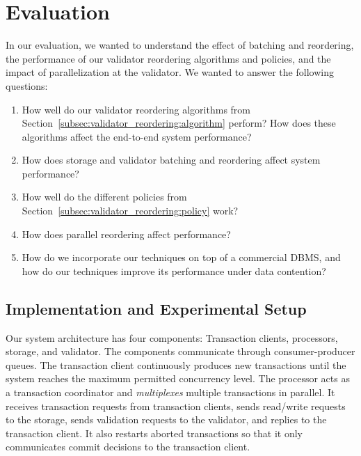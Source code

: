 \section{Evaluation}\label{sec:experiments}

In our evaluation, we wanted to understand the effect of batching and reordering, the performance of our validator reordering algorithms and policies, and the impact of parallelization at the validator.
We wanted to answer the following questions:
\begin{enumerate}[leftmargin=*]
\item How well do our validator reordering algorithms from Section~\ref{subsec:validator_reordering:algorithm} perform? How does these algorithms affect the end-to-end system performance?
\vspace{-0.5em}
\item How does storage and validator batching and reordering
  affect system performance?
\vspace{-0.5em}
\item How well do the different policies from Section~\ref{subsec:validator_reordering:policy} work?
\vspace{-0.5em}
\item How does parallel reordering affect performance?
\vspace{-0.5em}
\item How do we incorporate our techniques on top of a commercial DBMS, and how do our techniques improve its performance under data contention?
\end{enumerate}

\subsection{Implementation and Experimental Setup}
\label{subsec:experiment:implementation}


Our system architecture has four components: Transaction clients, processors, storage, and validator. The components communicate through consumer-producer queues. 
The transaction client continuously produces new transactions until the system reaches the maximum permitted concurrency level. The processor acts as a transaction coordinator and \emph{multiplexes} multiple transactions in parallel. It receives transaction requests from transaction clients, sends read/write requests to the storage, sends validation requests to the validator, and replies to the transaction client. It also restarts aborted transactions so that it only communicates commit decisions to the transaction client.

